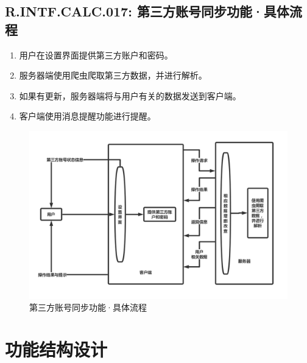         {
        \color{red}
        \subsection{\color{red}R.INTF.CALC.017: 第三方账号同步功能·具体流程}
            \begin{enumerate}
                \item 用户在设置界面提供第三方账户和密码。
                \item 服务器端使用爬虫爬取第三方数据，并进行解析。
                \item 如果有更新，服务器端将与用户有关的数据发送到客户端。
                \item 客户端使用消息提醒功能进行提醒。
            \end{enumerate}
        }
        \begin{figure}[h]
            \centering
            \includegraphics[scale=0.35]{OutlineDesign/figures/第三方账号同步功能·具体流程.png}
            \caption{\color{red}第三方账号同步功能·具体流程}
            \label{fig:server_flow}
        \end{figure}
        \newpage
\section{功能结构设计}
